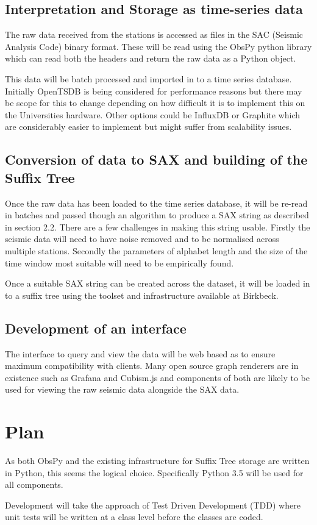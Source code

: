 \documentclass[11pt]{scrartcl}
\begin{document}
\subsection{Interpretation and Storage as time-series data}
	The raw data received from the stations is accessed as files in the SAC (Seismic Analysis Code) binary format.  These will be read using the ObsPy python library which can read both the headers and return the raw data as a Python object.
	
	This data will be batch processed and imported in to a time series database.  Initially OpenTSDB is being considered for performance reasons but there may be scope for this to change depending on how difficult it is to implement this on the Universities hardware.  Other options could be InfluxDB or Graphite which are considerably easier to implement but might suffer from scalability issues.

\subsection{Conversion of data to SAX and building of the Suffix Tree}
	Once the raw data has been loaded to the time series database, it will be re-read in batches and passed though an algorithm to produce a SAX string as described in section 2.2.  There are a few challenges in making this string usable.  Firstly the seismic data will need to have noise removed and to be normalised across multiple stations.  Secondly the parameters of alphabet length and the size of the time window most suitable will need to be empirically found.
	
	Once a suitable SAX string can be created across the dataset, it will be loaded in to a suffix tree using the toolset and infrastructure available at Birkbeck.

\subsection{Development of an interface}
	The interface to query and view the data will be web based as to ensure maximum compatibility with clients.  Many open source graph renderers are in existence such as Grafana and Cubism.js and components of both are likely to be used for viewing the raw seismic data alongside the SAX data.

\section{Plan}
	As both ObsPy and the existing infrastructure for Suffix Tree storage are written in Python, this seems the logical choice.  Specifically Python 3.5 will be used for all components.	
	
	Development will take the approach of Test Driven Development (TDD) where unit tests will be written at a class level before the classes are coded.


\end{document}
